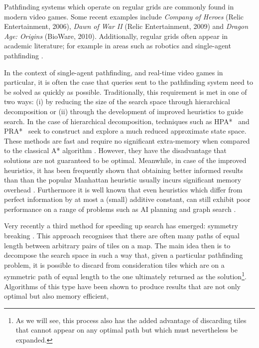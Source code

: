 Pathfinding systems which operate on regular grids are commonly found in modern video games.
Some recent examples include \emph{Company of Heroes} (Relic Entertainment, 2006), \emph{Dawn of War II} (Relic
Entertainment, 2009) and \emph{Dragon Age: Origins} (BioWare, 2010).
Additionally, regular grids often appear in academic literature; for example in areas such as robotics \cite{choset05} and
single-agent pathfinding \cite{yap02,botea04,sturtevant07,harabor08}.
\par
In the context of single-agent pathfinding, and real-time video games in particular, it is often the case that queries sent to
the pathfinding system  need to be solved as quickly as possible.
Traditionally, this requirement is met in one of two ways: (i) by reducing the size of the search space through hierarchical 
decomposition or (ii) through the development of improved heuristics to guide search.
In the case of hierarchical decomposition, techniques such as
HPA*~\cite{botea04} and PRA*~\cite{sturtevant05} seek to construct and explore
a much reduced approximate state space.
These methods are fast and require no significant extra-memory when compared to the classical
A* algorithm \cite{hart68}.
However, they have the disadvantage that solutions are not guaranteed to be optimal.
Meanwhile, in case of the improved heuristics, it has been frequently shown
that obtaining better informed results than than the popular
Manhattan heuristic usually incurs significant memory overhead 
\cite{sturtevant09,goldberg05,Cazenave:06,bjornsson06}.
Furthermore it is well known that even heuristics which differ from perfect information 
by at most a (small) additive constant, can still exhibit poor performance on a range of 
problems such as AI planning and graph search \cite{helmert08,pohl77}.
\par
Very recently a third method for speeding up search has emerged: symmetry breaking \cite{pochter10,harabor10}.
This approach recognises that there are often many paths of equal length between arbitrary pairs of tiles on a map.
The main idea then is to decompose the search space in such a way that, given a particular pathfinding problem, it is possible to
discard from consideration tiles which are on a symmetric path of equal length to the one ultimately returned 
as the solution\footnote{
As we will see, this process also has the added advantage of discarding tiles 
that cannot appear on any optimal path but which must nevertheless be expanded.}.
Algorithms of this type have been  shown to produce results that are not only optimal but also memory efficient, 

